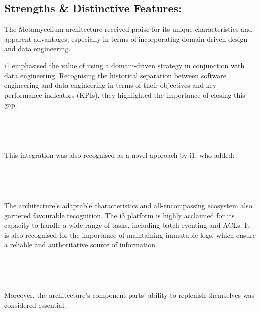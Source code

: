 \documentclass[journal]{IEEEtran}
\begin{document}
\subsection{Strengths \& Distinctive Features:}

The Metamycelium architecture received praise for its unique characteristics and apparent advantages, especially in terms of incorporating domain-driven design and data engineering.

i1 emphasised the value of using a domain-driven strategy in conjunction with data engineering. Recognising the historical separation between software engineering and data engineering in terms of their objectives and key performance indicators (KPIs), they highlighted the importance of closing this gap.


\,

\setlength{\fboxsep}{0.3em}
\noindent{}

\,


This integration was also recognised as a novel approach by i1, who added:

\,



\setlength{\fboxsep}{0.3em}
\noindent{}

\,


The architecture's adaptable characteristics and all-encompassing ecosystem also garnered favourable recognition. The i3 platform is highly acclaimed for its capacity to handle a wide range of tasks, including batch eventing and ACLs. It is also recognised for the importance of maintaining immutable logs, which ensure a reliable and authoritative source of information.

\,

\setlength{\fboxsep}{0.3em}
\noindent{}

\,


Moreover, the architecture's component parts' ability to replenish themselves was considered essential.
\end{document}
